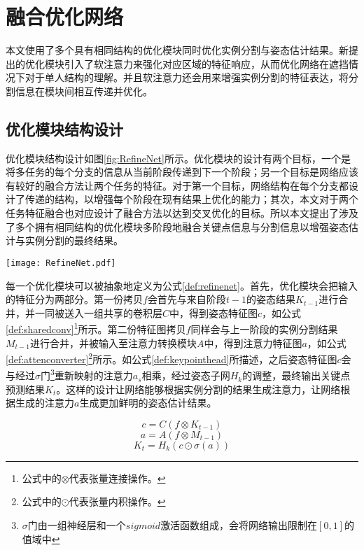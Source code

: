 \section{融合优化网络}
\label{sec:refine}
本文使用了多个具有相同结构的优化模块同时优化实例分割与姿态估计结果。新提出的优化模块引入了软注意力来强化对应区域的特征响应，从而优化网络在遮挡情况下对于单人结构的理解。并且软注意力还会用来增强实例分割的特征表达，将分割信息在模块间相互传递并优化。

\subsection{优化模块结构设计}
\label{subsec:architecture}

优化模块结构设计如图\ref{fig:RefineNet}所示。优化模块的设计有两个目标，一个是将多任务的每个分支的信息从当前阶段传递到下一个阶段；另一个目标是网络应该有较好的融合方法让两个任务的特征。对于第一个目标，网络结构在每个分支都设计了传递的结构，以增强每个阶段在现有结果上优化的能力；其次，本文对于两个任务特征融合也对应设计了融合方法以达到交叉优化的目标。所以本文提出了涉及了多个拥有相同结构的优化模块多阶段地融合关键点信息与分割信息以增强姿态估计与实例分割的最终结果。

\begin{figure*}[h]	
	\centering
	\texttt{[image: RefineNet.pdf]}
	\caption{融合优化模块具体设计}
	\label{fig:RefineNet}
\end{figure*}

每一个优化模块可以被抽象地定义为公式\eqref{def:refinenet}。首先，优化模块会把输入的特征分为两部分。第一份拷贝$f$会首先与来自阶段$t-1$的姿态结果$K_{t-1}$进行合并，并一同被送入一组共享的卷积层$C$中，得到姿态特征图$c$，如公式\eqref{def:sharedconv}\footnote{公式中的$\otimes$代表张量连接操作。}所示。第二份特征图拷贝$f$同样会与上一阶段的实例分割结果$M_{t-1}$进行合并，并被输入至注意力转换模块$A$中，得到注意力特征图$a$，如公式\eqref{def:attenconverter}\footnote{公式中的$\odot$代表张量内积操作。}所示。如公式\eqref{def:keypointhead}所描述，之后姿态特征图$c$会与经过$\sigma$门\footnote{$\sigma$门由一组神经层和一个$sigmoid$激活函数组成，会将网络输出限制在$[0,1]$的值域中}重新映射的注意力$a_s$相乘，经过姿态子网$H_k$的调整，最终输出关键点预测结果$K_t$。这样的设计让网络能够根据实例分割的结果生成注意力，让网络根据生成的注意力$a$生成更加鲜明的姿态估计结果。

\begin{equation}
\label{def:sharedconv}
c = C(f\otimes{K_{t-1}})
\end{equation}
\begin{equation}
\label{def:attenconverter}
a = A(f\otimes{M_{t-1}})
\end{equation}
\begin{equation}
\label{def:keypointhead}
K_t = H_k(c\odot \sigma(a))
\end{equation}

